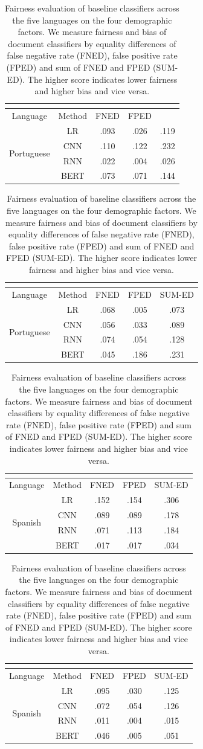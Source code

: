 \begin{table}[htp]
\begin{tabular}{cc|ccc}
\multicolumn{5}{c}{} \\\hline\hline
Language & Method & FNED & FPED \\\hline
\multirow{4}{*}{Portuguese} & LR & .093 & .026 & .119\\
 & CNN  & .110 & .122 & .232 \\
 & RNN  & .022 & .004 & .026 \\
 & BERT & .073 & .071 & .144
\end{tabular}
\quad
\begin{tabular}{cc|ccc}
\multicolumn{5}{c}{} \\\hline\hline
Language & Method & FNED & FPED & SUM-ED \\\hline
\multirow{4}{*}{Portuguese} & LR  & .068 & .005 & .073 \\
 & CNN  & .056 & .033 & .089 \\
 & RNN  & .074 & .054 & .128 \\
 & BERT & .045 & .186 & .231
\end{tabular}

\begin{tabular}{cc|ccc}
\multicolumn{5}{c}{} \\\hline\hline
Language & Method & FNED & FPED & SUM-ED \\\hline
\multirow{4}{*}{Spanish} & LR & .152 & .154 & .306\\
 & CNN  & .089 & .089 & .178 \\
 & RNN  & .071 & .113 & .184 \\
 & BERT & .017 & .017 & .034
\end{tabular}
\quad
\begin{tabular}{cc|ccc}
\multicolumn{5}{c}{} \\\hline\hline
Language & Method & FNED & FPED & SUM-ED \\\hline
\multirow{4}{*}{Spanish} & LR & .095 & .030 & .125 \\
 & CNN  & .072 & .054 & .126 \\
 & RNN  & .011 & .004 & .015 \\
 & BERT & .046 & .005 & .051
\end{tabular}
\caption{Fairness evaluation of baseline classifiers across the five languages on the four demographic factors. We measure fairness and bias of document classifiers by equality differences of false negative rate (FNED), false positive rate (FPED) and sum of FNED and FPED (SUM-ED). The higher score indicates lower fairness and higher bias and vice versa.}
\label{tab:fairness}
\end{table}

